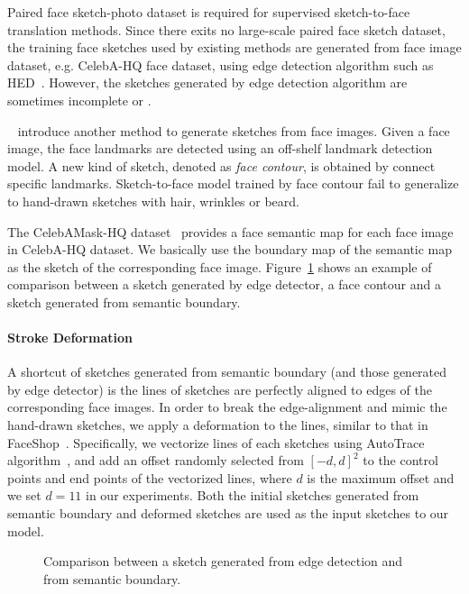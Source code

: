 

Paired face sketch-photo dataset is required for supervised sketch-to-face translation methods.
Since there exits no large-scale paired face sketch dataset, the training face sketches used by existing methods are generated from face image dataset, e.g. CelebA-HQ face dataset, using edge detection algorithm such as HED~\cite{HED}.
%
However, the sketches generated by edge detection algorithm are sometimes incomplete or . 

~\cite{pix2pixHD} introduce another method to generate sketches from face images. Given a face image, the face landmarks are detected using an off-shelf landmark detection model. A new kind of sketch, denoted as \textit{face contour}, is obtained by connect specific landmarks. Sketch-to-face model trained by face contour fail to generalize to hand-drawn sketches with hair, wrinkles or beard. 

The CelebAMask-HQ dataset~\cite{CelebAMask-HQ} provides a face semantic map for each face image in CelebA-HQ dataset. We basically use the boundary map of the semantic map as the sketch of the corresponding face image. Figure~\ref{fig:sketch_data} shows an example of comparison between a sketch generated by edge detector, a face contour and a sketch generated from semantic boundary.
%


\paragraph{Stroke Deformation}
A shortcut of sketches generated from semantic boundary (and those generated by edge detector) is the lines of sketches are perfectly aligned to edges of the corresponding face images. In order to break the edge-alignment and mimic the hand-drawn sketches, we apply a deformation to the lines, similar to that in FaceShop~\cite{FaceShop}. Specifically, we vectorize lines of each sketches using AutoTrace algorithm~\cite{AutoTrace}, and add an offset randomly selected from $[-d, d]^2$ to the control points and end points of the vectorized lines, where $d$ is the maximum offset and we set $d=11$ in our experiments.
%
Both the initial sketches generated from semantic boundary and deformed sketches are used as the input sketches to our model.


\begin{figure}
	\centering
	\vspace{1.0cm}
	\caption{Comparison between a sketch generated from edge detection and from semantic boundary.}
	\label{fig:sketch_data}
\end{figure}